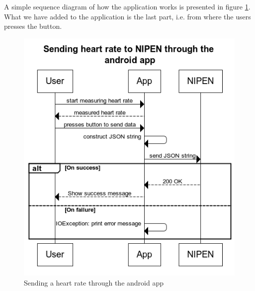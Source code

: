 A simple sequence diagram of how the application works is presented in figure \ref{figure:sending-heart-rate-through-app}.
What we have added to the application is the last part, i.e. from where the users presses the button.

\begin{figure}[h]
\centering
\includegraphics[scale=1.0]{../Figures/sending-heart-rate-through-app.png}
\caption{Sending a heart rate through the android app}
\label{figure:sending-heart-rate-through-app}
\end{figure}

